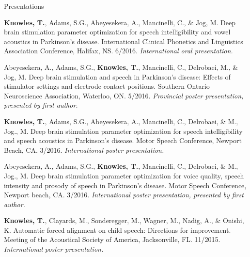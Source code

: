 \documentclass{resume} %
\begin{document}
\begin{rSection}{Presentations}
\begin{etaremune}
\item {\bf Knowles, T.}, Adams, S.G., Abeyesekera, A., Mancinelli, C., \& Jog, M. Deep brain stimulation parameter optimization for speech intelligibility and vowel acoustics in Parkinson's disease. International Clinical Phonetics and Linguistics Association Conference, Halifax, NS. 6/2016. \emph{International oral presentation.}
	
\item Abeyesekera, A., Adams, S.G., {\bf Knowles, T.}, Mancinelli, C., Delrobaei, M., \& Jog, M. Deep brain stimulation and speech in Parkinson's disease: Effects of stimulator settings and electrode contact positions. Southern Ontario Neuroscience Association, Waterloo, ON. 5/2016. \emph{Provincial poster presentation, presented by first author.}
	
	
	
\item {\bf Knowles, T.}, Adams, S.G., Abeyesekera, A., Mancinelli, C., Delrobaei, \& M., Jog., M. Deep brain stimulation parameter optimization for speech intelligibility and speech acoustics in Parkinson's disease. Motor Speech Conference, Newport Beach, CA. 3/2016. \emph{International poster presentation.}
	
\item Abeyesekera, A., Adams, S.G., {\bf Knowles, T.}, Mancinelli, C., Delrobaei, \& M., Jog., M. Deep brain stimulation parameter optimization for voice quality, speech intensity and prosody of speech in Parkinson's disease. Motor Speech Conference, Newport beach, CA. 3/2016. \emph{International poster presentation, presented by first author.}
	
	
\item {\bf Knowles, T.}, Clayards, M., Sonderegger, M., Wagner, M., Nadig, A., \& Onishi, K. Automatic forced alignment on child speech: Directions for improvement. Meeting of the Acoustical Society of America, Jacksonville, FL. 11/2015. \emph{International poster presentation.}
	

\end{etaremune}
\end{rSection}
\end{document}

